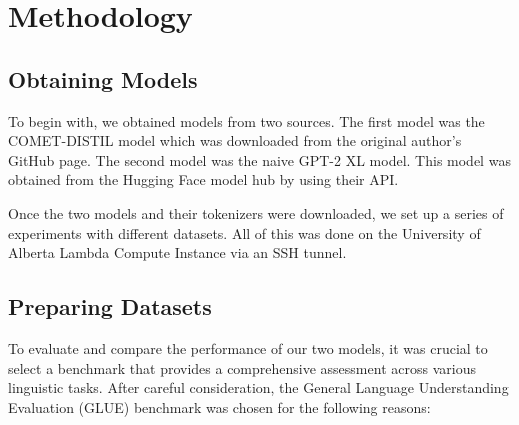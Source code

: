 \documentclass[\main/thesis.tex]{subfiles}
\begin{document}
\chapter{Methodology}\label{chap:methodology}

\section{Obtaining Models}\label{sec:ObtainingModels}
To begin with, we obtained models from two sources. The first model was the COMET-DISTIL model
which was downloaded from the original author's GitHub page\cite{west_symbolic_2021}. The second model 
was the naive GPT-2 XL model. This model was obtained from the Hugging Face model hub by using their API.\@

Once the two models and their tokenizers were downloaded, we set up a series of experiments with 
different datasets. All of this was done on the University of Alberta Lambda Compute Instance via an SSH tunnel. 

\section{Preparing Datasets}\label{sec:PrepareDataset}
To evaluate and compare the performance of our two models, it was crucial to select a benchmark 
that provides a comprehensive assessment across various linguistic tasks. 
After careful consideration, the General Language Understanding Evaluation (GLUE)\cite{wang_glue_2019} benchmark was chosen for the following reasons:
\end{document}
